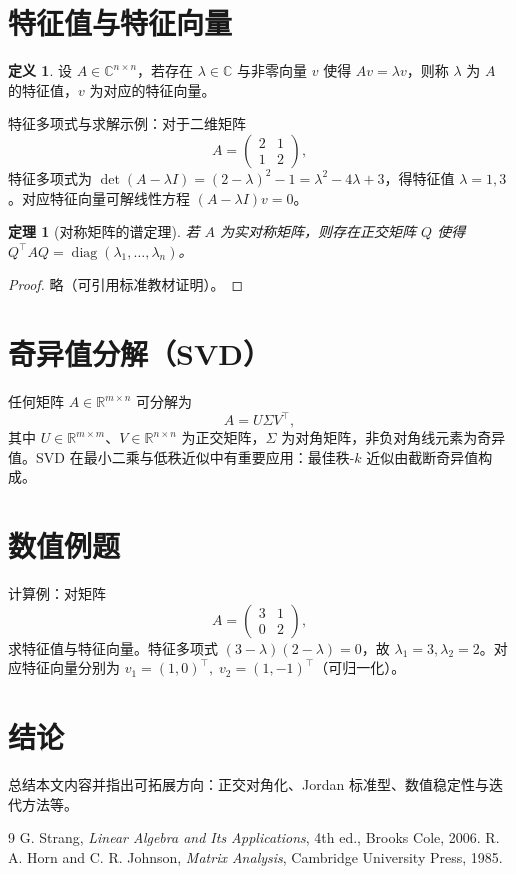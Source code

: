 \documentclass[12pt]{ctexart}
\theoremstyle{plain}
\newtheorem{theorem}{定理}[section]
\theoremstyle{definition}
\newtheorem{definition}{定义}[section]
\theoremstyle{remark}
\begin{document}
\section{特征值与特征向量}
\begin{definition}
设 $A\in\mathbb{C}^{n\times n}$，若存在 $\lambda\in\mathbb{C}$ 与非零向量 $v$ 使得 $Av=\lambda v$，则称 $\lambda$ 为 $A$ 的特征值，$v$ 为对应的特征向量。
\end{definition}

特征多项式与求解示例：对于二维矩阵
\[
A=\begin{pmatrix}2 & 1\\ 1 & 2\end{pmatrix},
\]
特征多项式为 $\det(A-\lambda I)=(2-\lambda)^2-1=\lambda^2-4\lambda+3$，得特征值 $\lambda=1,3$。对应特征向量可解线性方程 $(A-\lambda I)v=0$。

\begin{theorem}[对称矩阵的谱定理]
若 $A$ 为实对称矩阵，则存在正交矩阵 $Q$ 使得 $Q^\top A Q = \operatorname{diag}(\lambda_1,\dots,\lambda_n)$。
\end{theorem}
\begin{proof}
略（可引用标准教材证明）。
\end{proof}

\section{奇异值分解（SVD）}
任何矩阵 $A\in\mathbb{R}^{m\times n}$ 可分解为
\[
A=U\Sigma V^\top,
\]
其中 $U\in\mathbb{R}^{m\times m}$、$V\in\mathbb{R}^{n\times n}$ 为正交矩阵，$\Sigma$ 为对角矩阵，非负对角线元素为奇异值。SVD 在最小二乘与低秩近似中有重要应用：最佳秩-$k$ 近似由截断奇异值构成。

\section{数值例题}
计算例：对矩阵
\[
A=\begin{pmatrix}3 & 1\\ 0 & 2\end{pmatrix},
\]
求特征值与特征向量。特征多项式 $(3-\lambda)(2-\lambda)=0$，故 $\lambda_1=3,\lambda_2=2$。对应特征向量分别为 $v_1=(1,0)^\top,\; v_2=(1,-1)^\top$（可归一化）。

\section{结论}
总结本文内容并指出可拓展方向：正交对角化、Jordan 标准型、数值稳定性与迭代方法等。

\begin{thebibliography}{9}
G. Strang, \emph{Linear Algebra and Its Applications}, 4th ed., Brooks Cole, 2006.
R. A. Horn and C. R. Johnson, \emph{Matrix Analysis}, Cambridge University Press, 1985.
\end{thebibliography}
\end{document}
